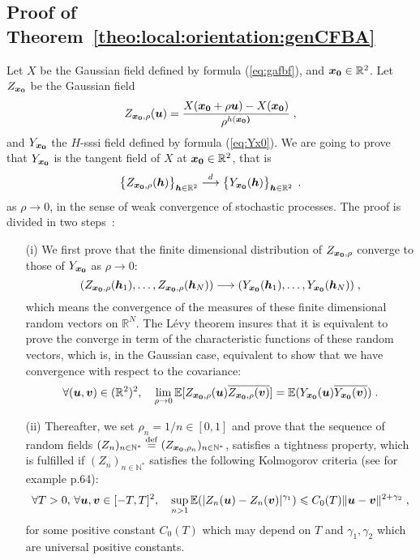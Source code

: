 \documentclass{elsarticle}
\begin{document}
\subsection{Proof of Theorem~\ref{theo:local:orientation:genCFBA}\\}\label{s:proof:local:orientation}
\label{proof:prop9}


Let $X$ be the Gaussian field defined by formula (\ref{eq:gafbf}), and $\bm{x_0}\in \mathbb{R}^2$. Let $Z_{\bm{x_0}}$ be the Gaussian field 
\[
Z_{\bm{x_0},\rho}(\bm{u})=\frac{X(\bm{x_0}+\rho \bm{u})-X(\bm{x_0})}{\rho^{h(\bm{x_0)}}}\;,
\]
and $Y_{\bm{x_0}}$ the $H$-sssi field defined by formula (\ref{eq:Yx0}). We are going to prove that $Y_{\bm{x_0}}$ is the tangent field of $X$ at $\bm{x_0}\in \mathbb{R}^2$, that is
\[
\left\{Z_{\bm{x_0},\rho}(\bm{h})\right\}_{\bm{h}\in \mathbb{R}^2}\overset{d}{\longrightarrow} \left\{Y_{\bm{x_0}}(\bm{h})\right\}_{\bm{h}\in \mathbb{R}^2}\;.
\]
as $\rho\to 0$, in the sense of weak convergence of stochastic processes. The proof is divided in two steps~:
\begin{itemize}
\item[(i)] We first prove that the finite dimensional distribution of $Z_{\bm{x_0},\rho}$ converge to those of $Y_{\bm{x_0}}$ as $\rho\to 0$:
\[
(Z_{\bm{x_0},\rho}(\bm{h}_1),\dotsc, Z_{\bm{x_0},\rho}(\bm{h}_N))\longrightarrow (Y_{\bm{x_0}}(\bm{h}_1),\dotsc,Y_{\bm{x_0}}(\bm{h}_N))\;,
\]
which means the convergence of the measures of these finite dimensional random vectors on $ \mathbb{R}^N$. The L\'evy theorem insures that it is equivalent to prove the converge in term of the characteristic functions of these random vectors, which is, in the Gaussian case, equivalent to show that we have convergence with respect to the covariance:
\begin{equation}\label{eq:convergence_cov}
\forall (\bm{u},\bm{v})\in (\mathbb{R}^2)^2,\quad \lim_{\rho\to 0}\mathbb{E}[Z_{\bm{x_0},\rho}(\bm{u})\overline{Z_{\bm{x_0},\rho}(\bm{v})}]=\mathbb{E}(Y_{\bm{x_0}}(\bm{u})\overline{Y_{\bm{x_0}}(\bm{v})})\;.
\end{equation}
\item[(ii)] Thereafter, we set $\rho_n=1/n\in [0,1]$ and prove that the sequence of random fields $(Z_n)_{n\in \mathbb{N}^{\ast}}\overset{\mathrm{def}}{=}(Z_{\bm{x_0},\rho_n})_{n\in \mathbb{N}^{\ast}}$, satisfies a tightness property, which is fulfilled if $(Z_n)_{n\in \mathbb{N}^{\ast}}$ satisfies the following Kolmogorov criteria (see for example \cite{KarShr88} p.64):
\begin{equation}\label{eq:kolmo_criteria}
\forall T>0, \, \forall \bm{u}, \bm{v}\in [-T,T]^{2},\quad \sup\limits_{n>1}\mathbb{E}(|Z_n(\bm{u})-Z_n(\bm{v})|^{\gamma_1})\leqslant C_{0}(T)\lVert \bm{u}-\bm{v}\rVert^{2+\gamma_2}\;,
\end{equation}
for some positive constant $C_{0}(T)$ which may depend on $T$ and $\gamma_1,\gamma_2$ which are universal positive constants.
\end{itemize}
\end{document}
